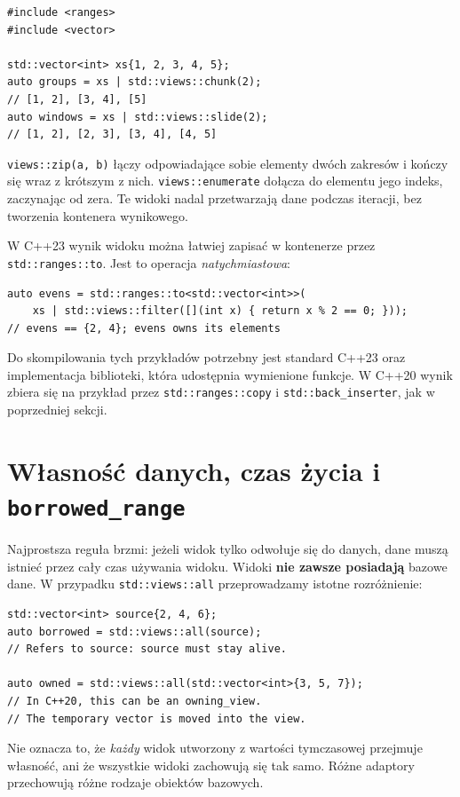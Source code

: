 \begin{lstlisting}
#include <ranges>
#include <vector>

std::vector<int> xs{1, 2, 3, 4, 5};
auto groups = xs | std::views::chunk(2);
// [1, 2], [3, 4], [5]
auto windows = xs | std::views::slide(2);
// [1, 2], [2, 3], [3, 4], [4, 5]
\end{lstlisting}

\texttt{views::zip(a, b)} łączy odpowiadające sobie elementy dwóch
zakresów i kończy się wraz z krótszym z nich. \texttt{views::enumerate}
dołącza do elementu jego indeks, zaczynając od zera. Te widoki nadal
przetwarzają dane podczas iteracji, bez tworzenia kontenera wynikowego.

W C++23 wynik widoku można łatwiej zapisać w kontenerze przez
\texttt{std::ranges::to}. Jest to operacja \emph{natychmiastowa}:

\begin{lstlisting}
auto evens = std::ranges::to<std::vector<int>>(
    xs | std::views::filter([](int x) { return x % 2 == 0; }));
// evens == {2, 4}; evens owns its elements
\end{lstlisting}

Do skompilowania tych przykładów potrzebny jest standard C++23 oraz
implementacja biblioteki, która udostępnia wymienione funkcje. W C++20
wynik zbiera się na przykład przez \texttt{std::ranges::copy} i
\texttt{std::back\_inserter}, jak w poprzedniej sekcji.

\section{Własność danych, czas życia i \texttt{borrowed\_range}}
\label{sec:cpp8-lifetime}

Najprostsza reguła brzmi: jeżeli widok tylko odwołuje się do danych,
dane muszą istnieć przez cały czas używania widoku. Widoki
\textbf{nie zawsze posiadają} bazowe dane. W przypadku
\texttt{std::views::all} przeprowadzamy istotne rozróżnienie:

\begin{lstlisting}
std::vector<int> source{2, 4, 6};
auto borrowed = std::views::all(source);
// Refers to source: source must stay alive.

auto owned = std::views::all(std::vector<int>{3, 5, 7});
// In C++20, this can be an owning_view.
// The temporary vector is moved into the view.
\end{lstlisting}

Nie oznacza to, że \emph{każdy} widok utworzony z wartości tymczasowej
przejmuje własność, ani że wszystkie widoki zachowują się tak samo.
Różne adaptory przechowują różne rodzaje obiektów bazowych.

